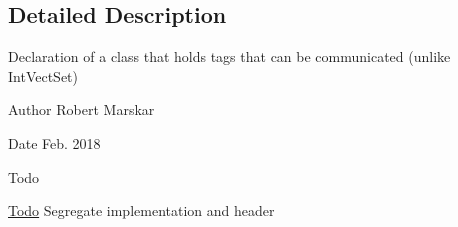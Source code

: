 \subsection{Detailed Description}
Declaration of a class that holds tags that can be communicated (unlike Int\+Vect\+Set) 

\begin{DoxyAuthor}{Author}
Robert Marskar 
\end{DoxyAuthor}
\begin{DoxyDate}{Date}
Feb. 2018 
\end{DoxyDate}
\begin{DoxyRefDesc}{Todo}
\item[\hyperlink{todo__todo000008}{Todo}]Segregate implementation and header \end{DoxyRefDesc}
